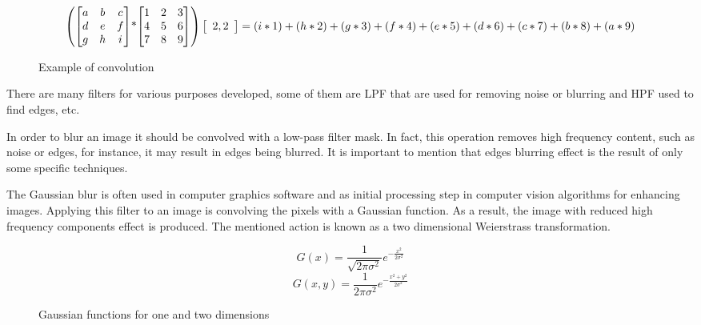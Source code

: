 \documentclass[../../../../main]{subfiles}
\begin{document}
\begin{figure} [!ht]
  \centering    
    \begin{equation}
        \begin{pmatrix} 
           \begin{bmatrix} 
               a & b & c \\ 
               d & e & f \\
               g & h & i
           \end{bmatrix}
           $*$
           \begin{bmatrix} 
               1 & 2 & 3 \\ 
               4 & 5 & 6 \\
               7 & 8 & 9
           \end{bmatrix}
        \end{pmatrix}
        \left[ \begin{array}{cc} 2, 2 \end{array} \right] = (i*1) + (h*2) + (g*3) + (f*4) + \\ (e*5)+ (d*6) + (c*7) + (b*8) + (a*9)
    \end{equation}
  \label{eq:mathematical_convolution}
  \caption{Example of convolution}
\end{figure}

There are many filters for various purposes developed, some of them are \ac{LPF} that are used for removing noise or blurring and \ac{HPF} used to find edges, etc.

In order to blur an image it should be convolved with a low-pass filter mask. In fact, this operation removes high frequency content, such as noise or edges, for instance, it may result in edges being blurred. It is important to mention that edges blurring effect is the result of only some specific techniques.

The Gaussian blur is often used in computer graphics software and as initial processing step in computer vision algorithms for enhancing images. Applying this filter to an image is convolving the pixels with a Gaussian function. As a result, the image with reduced high frequency components effect is produced. The mentioned action is known as a two dimensional Weierstrass transformation.

\begin{figure} [!ht]
  \centering
    \begin{equation}
        G(x)=\frac{1}{\sqrt{2\pi\sigma^2}}e^{-\frac{x^2}{2\sigma^2}}
    \end{equation}
    \begin{equation}
        G(x,y)=\frac{1}{2\pi\sigma^2}e^{-\frac{x^2+y^2}{2\sigma^2}}
    \end{equation}
    \label{fig:gaussian_functions}
    \caption{Gaussian functions for one and two dimensions}
\end{figure}
\end{document}

